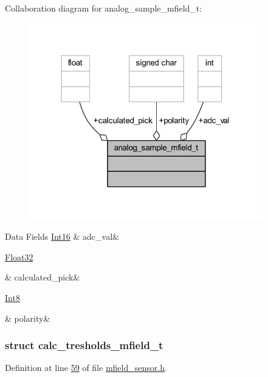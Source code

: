 Collaboration diagram for analog\+\_\+sample\+\_\+mfield\+\_\+t\+:\nopagebreak
\begin{figure}[H]
\begin{center}
\leavevmode
\includegraphics[width=289pt]{d8/d18/a00948}
\end{center}
\end{figure}
\begin{DoxyFields}{Data Fields}
\hypertarget{a00019_a9568f2e3dbed66848fe6d9d352933b9a}{\hyperlink{a00072_a659ce9e5eb6571f9984ffc7caad2660a}{Int16}}\label{a00019_a9568f2e3dbed66848fe6d9d352933b9a}
&
adc\+\_\+val&
\\
\hline

\hypertarget{a00019_ac4ae69b7df3459cce228e151e9811a83}{\hyperlink{a00072_a87d38f886e617ced2698fc55afa07637}{Float32}}\label{a00019_ac4ae69b7df3459cce228e151e9811a83}
&
calculated\+\_\+pick&
\\
\hline

\hypertarget{a00019_a45152a3cd909463d7c924c30b575a073}{\hyperlink{a00072_a7e31ca7716b8d85dd473450a5c5e5a97}{Int8}}\label{a00019_a45152a3cd909463d7c924c30b575a073}
&
polarity&
\\
\hline

\end{DoxyFields}
\label{d9/d0d/a00298}
\hypertarget{a00019_d9/d0d/a00298}{}
\subsubsection{struct calc\+\_\+tresholds\+\_\+mfield\+\_\+t}


Definition at line \hyperlink{a00019_source_l00059}{59} of file \hyperlink{a00019_source}{mfield\+\_\+sensor.\+h}.



